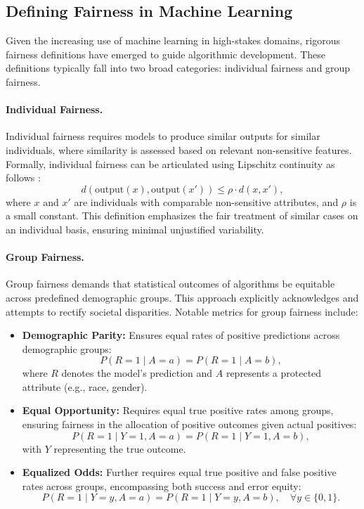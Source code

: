 \subsection{Defining Fairness in Machine
Learning}\label{subsec:fairness_definitions}

Given the increasing use of machine learning in high-stakes domains,
rigorous fairness definitions have emerged to guide
algorithmic development. These definitions typically fall into two
broad categories: individual fairness and group fairness.

\paragraph{Individual Fairness.}
Individual fairness requires models to produce similar outputs for
similar individuals, where similarity is assessed based
on relevant non-sensitive features. Formally, individual fairness can
be articulated using Lipschitz continuity
as follows \cite{dwork2012fairness}:
\[
  d(\text{output}(x), \text{output}(x')) \leq \rho \cdot d(x, x'),
\]
where \(x\) and \(x'\) are individuals with comparable non-sensitive
attributes, and \(\rho\) is a small constant. This definition
emphasizes the fair treatment of similar cases on an individual
basis, ensuring minimal unjustified variability.

\paragraph{Group Fairness.}
Group fairness demands that statistical outcomes of algorithms be
equitable across predefined demographic groups.
This approach explicitly acknowledges and attempts to rectify
societal disparities. Notable metrics
for group fairness include:

\begin{itemize}
  \item \textbf{Demographic Parity:} Ensures equal rates of positive
    predictions across demographic groups:
    \[
      P(R = 1 \mid A = a) = P(R = 1 \mid A = b),
    \]
    where \(R\) denotes the model's prediction and \(A\) represents a
    protected attribute (e.g., race, gender).

  \item \textbf{Equal Opportunity:} Requires equal true positive
    rates among groups, ensuring fairness in the
    allocation of positive outcomes given actual positives:
    \[
      P(R = 1 \mid Y = 1, A = a) = P(R = 1 \mid Y = 1, A = b),
    \]
    with \(Y\) representing the true outcome.

  \item \textbf{Equalized Odds:} Further requires equal true positive
    and false positive rates across groups,
    encompassing both success and error equity:
    \[
      P(R = 1 \mid Y = y, A = a) = P(R = 1 \mid Y = y, A = b), \quad
      \forall y \in \{0, 1\}.
    \]
\end{itemize}

